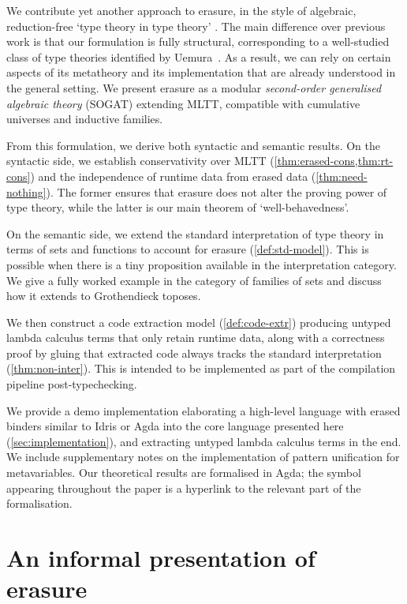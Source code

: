 \documentclass[a4paper,UKenglish,cleveref,autoref,thm-restate]{lipics-v2021}
\begin{document}
We contribute yet another approach to erasure, in the style of algebraic,
reduction-free `type theory in type theory' \cite{Altenkirch2016-zc}. The main
difference over previous work is that our formulation is fully structural,
corresponding to a well-studied class of type theories identified by
Uemura~\cite{Uemura2021-jq}. As a result, we can rely on certain aspects of its
metatheory and its implementation that are already understood in the general
setting. We present erasure as a modular \emph{second-order generalised
algebraic theory} (SOGAT) extending MLTT, compatible with cumulative universes
and inductive families.

From this formulation, we derive both syntactic and semantic results. On the
syntactic side, we establish conservativity over MLTT
(\cref{thm:erased-cons,thm:rt-cons}) and the independence of runtime data from
erased data (\cref{thm:need-nothing}). The former ensures that erasure does not
alter the proving power of type theory, while the latter is our main theorem of
`well-behavedness'.

On the semantic side, we extend the standard interpretation of type theory in
terms of sets and functions to account for erasure (\cref{def:std-model}). This
is possible when there is a tiny proposition available in the interpretation
category. We give a fully worked example in the category of families of sets
and discuss how it extends to Grothendieck toposes.

We then construct a code extraction model (\cref{def:code-extr}) producing
untyped lambda calculus terms that only retain runtime data, along with a
correctness proof by gluing that extracted code always tracks the standard
interpretation (\cref{thm:non-inter}). This is intended to be implemented as
part of the compilation pipeline post-typechecking.

We provide a demo implementation elaborating a high-level language with erased
binders similar to Idris or Agda into the core language presented here
(\cref{sec:implementation}), and extracting untyped lambda calculus terms in the
end. We include supplementary notes on the implementation of pattern unification
for metavariables. Our theoretical results are formalised in Agda; the symbol
 appearing throughout
the paper is a hyperlink to the relevant part of the formalisation.

\section{An informal presentation of erasure} \label{sec:informal-itt}
\end{document}
